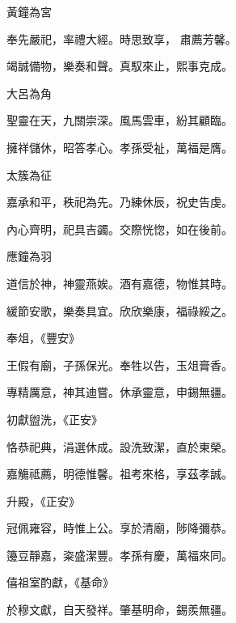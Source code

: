 \begin{pinyinscope}
 黃鐘為宮



 奉先嚴祀，率禮大經。時思致享，
 肅薦芳馨。



 竭誠備物，樂奏和聲。真馭來止，熙事克成。



 大呂為角



 聖靈在天，九關崇深。風馬雲車，紛其顧臨。



 擁祥儲休，昭答孝心。孝孫受祉，萬福是膺。



 太簇為征



 嘉承和平，秩祀為先。乃練休辰，祝史告虔。



 內心齊明，祀具吉蠲。交際恍惚，如在後前。



 應鐘為羽



 道信於神，神靈燕娭。酒有嘉德，物惟其時。



 緩節安歌，樂奏具宜。欣欣樂康，福祿綏之。



 奉俎，《豐安》



 王假有廟，子孫保光。奉牲以告，玉俎膏香。



 專精厲意，神其迪嘗。休承靈意，申錫無疆。



 初獻盥洗，《正安》



 恪恭祀典，涓選休成。設洗致潔，直於東榮。



 嘉觴祗薦，明德惟馨。祖考來格，享茲孝誠。



 升殿，《正安》



 冠佩雍容，時惟上公。享於清廟，陟降彌恭。



 籩豆靜嘉，粢盛潔豐。孝孫有慶，萬福來同。



 僖祖室酌獻，《基命》



 於穆文獻，自天發祥。肇基明命，錫羨無疆。




\end{pinyinscope}
